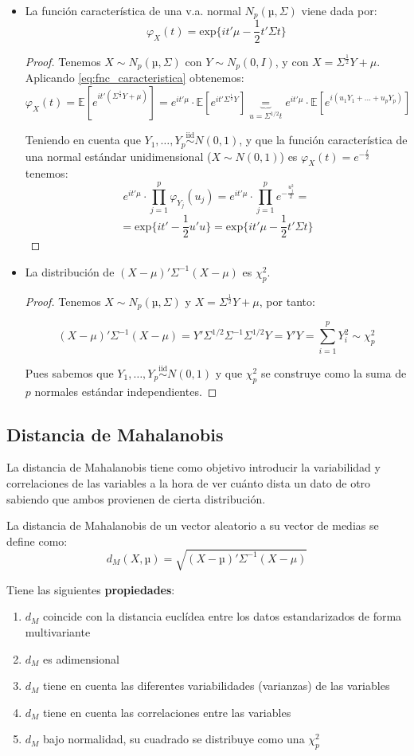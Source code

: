 \begin{itemize}
	\item La función característica de una v.a. normal $N_p(µ,Σ)$ viene dada por:
	\[φ_X(t) = \text{exp}\{it'μ-\frac{1}{2}t'Σt\}\]
	\begin{proof}
		Tenemos $X\sim N_p(µ,Σ)$ con $Y\sim N_p(0,I)$, y con $X=Σ^{\frac{1}{2}}Y + μ$. Aplicando \ref{eq:fnc_caracteristica} obtenemos:
		\[φ_X(t) = \mathbb{E}\left[ e^{it'(Σ^{\frac{1}{2}}Y + μ)} \right] = e^{it'μ}·\mathbb{E}\left[ e^{it'Σ^{\frac{1}{2}}Y} \right] \underbrace{=}_{u=Σ^{1/2}t} e^{it'μ}·\mathbb{E}\left[ e^{i(u_1Y_1 + … + u_pY_p)} \right]\]

		Teniendo en cuenta que $Y_1,…,Y_p \overset{\text{iid}}{\sim}N(0,1)$, y que la función característica de una normal estándar unidimensional ($X\sim N(0,1)$) es $φ_X(t)=e^{-\frac{t}{2}}$ tenemos:
		\[e^{it'μ}·\prod_{j=1}^pφ_{Y_j}(u_j) = e^{it'μ}·\prod_{j=1}^p e^{-\frac{u_j^2}{2}}=\]
		\[=\text{exp}\{it'-\frac{1}{2}u'u\} = \text{exp}\{it'μ-\frac{1}{2}t'Σt\}\]
	\end{proof}

	\item La distribución de $(X-μ)'Σ^{-1}(X-μ)$ es $χ_p^2$.
	\begin{proof}
		Tenemos $X\sim N_p(µ,Σ)$ y $X=Σ^{\frac{1}{2}}Y + μ$, por tanto: 

		\[(X-μ)'Σ^{-1}(X-μ) = Y'Σ^{1/2}Σ^{-1}Σ^{1/2}Y = Y'Y = \sum_{i=1}^p Y_i^2 \sim χ_p^2\]

		Pues sabemos que $Y_1,…,Y_p \overset{\text{iid}}{\sim}N(0,1)$ y que $χ_p^2$ se construye como la suma de $p$ normales estándar independientes.
	\end{proof}
\end{itemize}

\subsection{Distancia de Mahalanobis}
La distancia de Mahalanobis tiene como objetivo introducir la variabilidad y correlaciones de las variables a la hora de ver cuánto dista un dato de otro sabiendo que ambos provienen de cierta distribución.

\begin{defn}\label{defn:distanciaMahalanobis}
	La distancia de Mahalanobis de un vector aleatorio a su vector de medias se define como:
	\[d_M(X,µ) = \sqrt{(X-µ)'Σ^{-1}(X-μ)}\]
\end{defn}

Tiene las siguientes \textbf{propiedades}:
\begin{enumerate}
	\item $d_M$ coincide con la distancia euclídea entre los datos estandarizados de forma multivariante
	\item $d_M$ es adimensional
	\item $d_M$ tiene en cuenta las diferentes variabilidades (varianzas) de las variables
	\item $d_M$ tiene en cuenta las correlaciones entre las variables
	\item $d_M$ bajo normalidad, su cuadrado se distribuye como una $χ_p^2$
\end{enumerate}

